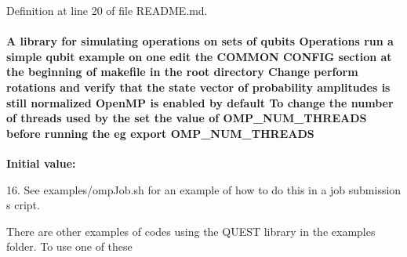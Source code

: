 Definition at line 20 of file README.md.\hypertarget{README_8md_ac0f875e6c5b5526a6781e0fbba81e6a4}{
\paragraph[{OMP\_\-NUM\_\-THREADS}]{\setlength{\rightskip}{0pt plus 5cm}A library for simulating operations on sets of qubits Operations run a simple qubit example on one edit the COMMON CONFIG section at the beginning of makefile in the root directory Change perform {\bf rotations} and verify that the state vector of probability amplitudes {\bf is} still normalized OpenMP {\bf is} enabled by default To change the number of threads used by the set the value of {\bf OMP\_\-NUM\_\-THREADS} before running the {\bf eg} export {\bf OMP\_\-NUM\_\-THREADS}}\hfill}
\label{README_8md_ac0f875e6c5b5526a6781e0fbba81e6a4}
{\bfseries Initial value:}
\begin{DoxyCode}
16. See examples/ompJob.sh for an example of how to do this in a job submission s
      cript.



There are other examples of codes using the QUEST library in the examples folder.
       To use one of these
\end{DoxyCode}


